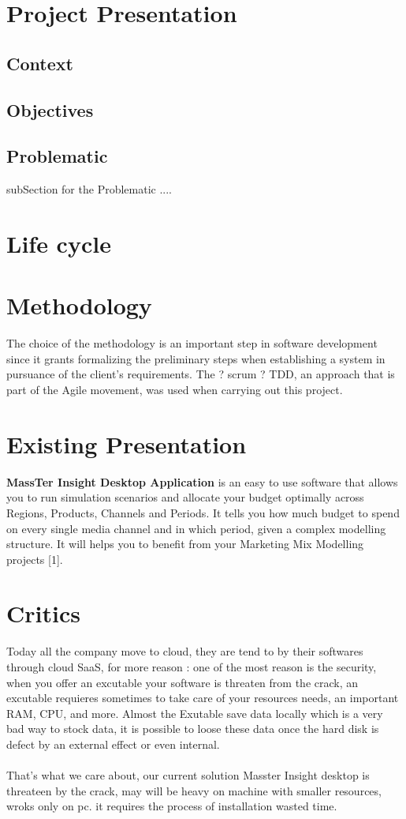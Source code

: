 \documentclass[12pt]{article}
\begin{document}
	\section{Project Presentation}
	
	\subsection{Context}
	\subsection{Objectives}
	\subsection{Problematic}
	subSection for the Problematic ....

	\section{Life cycle}
	\section{Methodology}
	The choice of the methodology is an important step in software development since it grants formalizing the preliminary steps when establishing a system in pursuance of the client’s requirements.
	The  ? scrum ? TDD, an approach that is part of the Agile movement, was used when carrying out this project.
		\section{Existing Presentation}
	\textbf{MassTer Insight Desktop Application} is an easy to use software that allows you to run simulation scenarios and allocate your budget optimally across Regions, Products, Channels and Periods. It tells you how much budget to spend on every single media channel and in which period, given a complex modelling structure. It will helps you to benefit from your Marketing Mix Modelling projects [1]. 
	\section{Critics}
	Today all the company move to cloud, they are tend to by their softwares through cloud SaaS, for more reason : one of the most reason is the security, when you offer an excutable your software is threaten from the crack, an excutable requieres sometimes to take care of your resources needs, an important RAM, CPU, and more. Almost the Exutable save data locally which is a very bad way to stock data, it is possible to loose these data once the hard disk is defect by an external effect or even internal.
	\\
	\\
	That's what we care about, our current solution Masster Insight desktop is threateen by the crack, may will be heavy on machine with smaller resources, wroks only on pc. it requires the process of installation wasted time.
	  
\end{document}
